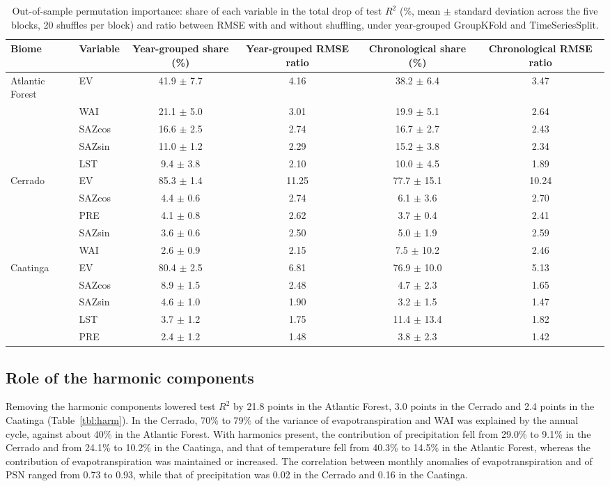 \documentclass[a4paper,fleqn]{cas-dc}
\begin{document}
\begin{table}[htbp]
\caption{Out-of-sample permutation importance: share of each variable in the total drop of test $R^2$ (\%, mean $\pm$ standard deviation across the five blocks, 20 shuffles per block) and ratio between RMSE with and without shuffling, under year-grouped GroupKFold and TimeSeriesSplit.}\label{tbl:perm}
\footnotesize
\begin{tabular*}{\tblwidth}{@{}LLCCCC@{}}
\toprule
Biome & Variable & Year-grouped share (\%) & Year-grouped RMSE ratio & Chronological share (\%) & Chronological RMSE ratio \\
\midrule
Atlantic Forest & EV & 41.9 $\pm$ 7.7 & 4.16 & 38.2 $\pm$ 6.4 & 3.47 \\
 & WAI & 21.1 $\pm$ 5.0 & 3.01 & 19.9 $\pm$ 5.1 & 2.64 \\
 & SAZcos & 16.6 $\pm$ 2.5 & 2.74 & 16.7 $\pm$ 2.7 & 2.43 \\
 & SAZsin & 11.0 $\pm$ 1.2 & 2.29 & 15.2 $\pm$ 3.8 & 2.34 \\
 & LST & 9.4 $\pm$ 3.8 & 2.10 & 10.0 $\pm$ 4.5 & 1.89 \\
Cerrado & EV & 85.3 $\pm$ 1.4 & 11.25 & 77.7 $\pm$ 15.1 & 10.24 \\
 & SAZcos & 4.4 $\pm$ 0.6 & 2.74 & 6.1 $\pm$ 3.6 & 2.70 \\
 & PRE & 4.1 $\pm$ 0.8 & 2.62 & 3.7 $\pm$ 0.4 & 2.41 \\
 & SAZsin & 3.6 $\pm$ 0.6 & 2.50 & 5.0 $\pm$ 1.9 & 2.59 \\
 & WAI & 2.6 $\pm$ 0.9 & 2.15 & 7.5 $\pm$ 10.2 & 2.46 \\
Caatinga & EV & 80.4 $\pm$ 2.5 & 6.81 & 76.9 $\pm$ 10.0 & 5.13 \\
 & SAZcos & 8.9 $\pm$ 1.5 & 2.48 & 4.7 $\pm$ 2.3 & 1.65 \\
 & SAZsin & 4.6 $\pm$ 1.0 & 1.90 & 3.2 $\pm$ 1.5 & 1.47 \\
 & LST & 3.7 $\pm$ 1.2 & 1.75 & 11.4 $\pm$ 13.4 & 1.82 \\
 & PRE & 2.4 $\pm$ 1.2 & 1.48 & 3.8 $\pm$ 2.3 & 1.42 \\
\bottomrule
\end{tabular*}
\end{table}

\subsection{Role of the harmonic components}

Removing the harmonic components lowered test $R^2$ by 21.8 points in the Atlantic Forest, 3.0 points in the Cerrado and 2.4 points in the Caatinga (Table~\ref{tbl:harm}). In the Cerrado, 70\% to 79\% of the variance of evapotranspiration and WAI was explained by the annual cycle, against about 40\% in the Atlantic Forest. With harmonics present, the contribution of precipitation fell from 29.0\% to 9.1\% in the Cerrado and from 24.1\% to 10.2\% in the Caatinga, and that of temperature fell from 40.3\% to 14.5\% in the Atlantic Forest, whereas the contribution of evapotranspiration was maintained or increased. The correlation between monthly anomalies of evapotranspiration and of PSN ranged from 0.73 to 0.93, while that of precipitation was 0.02 in the Cerrado and 0.16 in the Caatinga.
\end{document}

